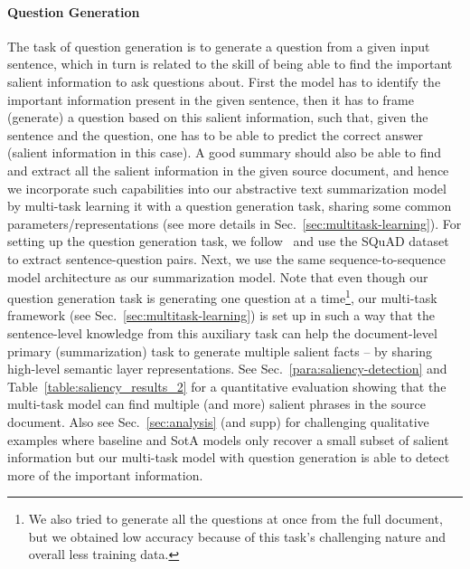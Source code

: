 \documentclass[11pt,a4paper]{article}
\begin{document}
\paragraph{Question Generation}
\label{paragraph:question-generation}
The task of question generation is to generate a question from a given input sentence, which in turn is related to the skill of being able to find the important salient information to ask questions about. First the model has to identify the important information present in the given sentence, then it has to frame (generate) a question based on this salient information, such that, given the sentence and the question, one has to be able to predict the correct answer (salient information in this case). A good summary should also be able to find and extract all the salient information in the given source document, and hence we incorporate such capabilities into our abstractive text summarization model by multi-task learning it with a question generation task, sharing some common parameters/representations (see more details in Sec.~\ref{sec:multitask-learning}).
For setting up the question generation task, we follow~ and use the SQuAD dataset to extract sentence-question pairs. Next, we use the same sequence-to-sequence model architecture as our summarization model. 
Note that even though our question generation task is generating one question at a time\footnote{We also tried to generate all the questions at once from the full document, but we obtained low accuracy because of this task's challenging nature and overall less training data.}, our multi-task framework (see Sec.~\ref{sec:multitask-learning}) is set up in such a way that the sentence-level knowledge from this auxiliary task can help the document-level primary (summarization) task to generate multiple salient facts -- by sharing high-level semantic layer representations. See Sec.~\ref{para:saliency-detection} and Table~\ref{table:saliency_results_2} for a quantitative evaluation showing that the multi-task model can find multiple (and more) salient phrases in the source document. Also see Sec.~\ref{sec:analysis} (and supp) for challenging qualitative examples where baseline and SotA models only recover a small subset of salient information but our multi-task model with question generation is able to detect more of the important information.
\end{document}
